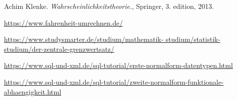 \documentclass[a4paper, 12pt]{article}
\begin{document}
\newpage

\begin{thebibliography}{9}
    Achim Klenke. \textit{Wahrscheinlichkeitstheorie.}, Springer, 3. edition, 2013.

    \href{https://www.fahrenheit-umrechnen.de/}{https://www.fahrenheit-umrechnen.de/}

    \href{https://www.studysmarter.de/studium/mathematik-studium/statistik-studium/der-zentrale-grenzwertsatz/}{https://www.studysmarter.de/studium/mathematik-
    studium/statistik-studium/der-zentrale-grenzwertsatz/}

    \href{https://www.sql-und-xml.de/sql-tutorial/erste-normalform-datentypen.html}{https://www.sql-und-xml.de/sql-tutorial/erste-normalform-datentypen.html}

    \href{https://www.sql-und-xml.de/sql-tutorial/zweite-normalform-funktionale-abhaengigkeit.html}{https://www.sql-und-xml.de/sql-tutorial/zweite-normalform-funktionale-abhaengigkeit.html}

\end{thebibliography}
\end{document}
